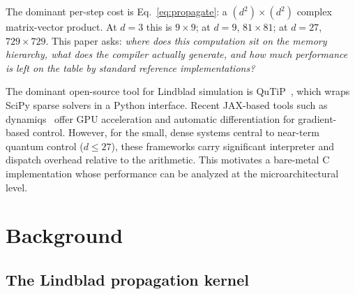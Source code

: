 \documentclass[final,3p,times,twocolumn]{elsarticle}
\begin{document}
The dominant per-step cost is Eq.~\eqref{eq:propagate}: a
$(d^2) \times (d^2)$ complex matrix-vector product. At $d = 3$ this is
$9 \times 9$; at $d = 9$, $81 \times 81$; at $d = 27$, $729 \times 729$.
This paper asks: \emph{where does this computation sit on the memory
hierarchy, what does the compiler actually generate, and how much performance
is left on the table by standard reference implementations?}

The dominant open-source tool for Lindblad simulation is
QuTiP~\cite{Johansson2012,Johansson2013}, which wraps SciPy sparse solvers
in a Python interface. Recent JAX-based tools such as
dynamiqs~\cite{Guilmin2024} offer GPU acceleration and automatic
differentiation for gradient-based control. However, for the small, dense
systems central to near-term quantum control ($d \leq 27$), these
frameworks carry significant interpreter and dispatch overhead relative to
the arithmetic. This motivates a bare-metal C implementation whose
performance can be analyzed at the microarchitectural level.

\section{Background}
\label{sec:background}

\subsection{The Lindblad propagation kernel}
\label{sec:kernel}
\end{document}
